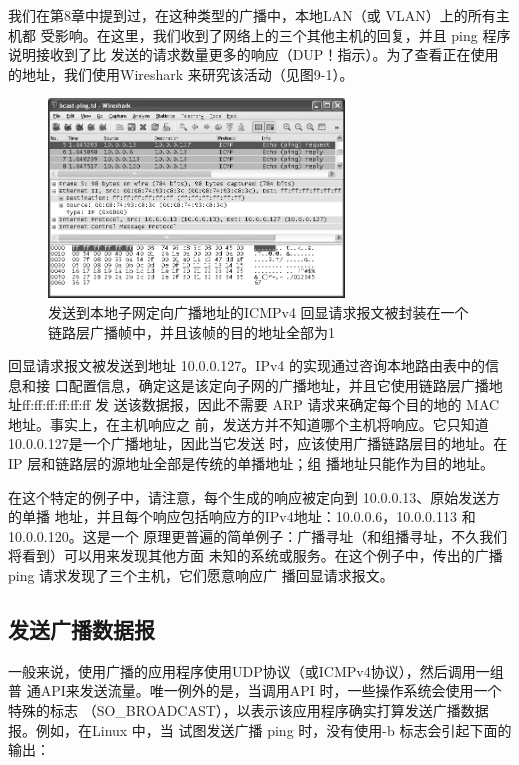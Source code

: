 我们在第8章中提到过，在这种类型的广播中，本地LAN（或 VLAN）上的所有主机都
受影响。在这里，我们收到了网络上的三个其他主机的回复，并且 ping 程序说明接收到了比
发送的请求数量更多的响应（DUP！指示）。为了查看正在使用的地址，我们使用Wireshark
来研究该活动（见图9-1）。

\begin{figure}[ht]
    \centering
	\includegraphics[width=0.7\textwidth]{imgs/9/9-1.png}
	\caption{发送到本地子网定向广播地址的ICMPv4 回显请求报文被封装在一个链路层广播帧中，并且该帧的目的地址全部为1}
\end{figure}

回显请求报文被发送到地址 10.0.0.127。IPv4 的实现通过咨询本地路由表中的信息和接
口配置信息，确定这是该定向子网的广播地址，并且它使用链路层广播地址ff:ff:ff:ff:ff:ff 发
送该数据报，因此不需要 ARP 请求来确定每个目的地的 MAC地址。事实上，在主机响应之
前，发送方并不知道哪个主机将响应。它只知道10.0.0.127是一个广播地址，因此当它发送
时，应该使用广播链路层目的地址。在IP 层和链路层的源地址全部是传统的单播地址；组
播地址只能作为目的地址。

在这个特定的例子中，请注意，每个生成的响应被定向到 10.0.0.13、原始发送方的单播
地址，并且每个响应包括响应方的IPv4地址：10.0.0.6，10.0.0.113 和 10.0.0.120。这是一个
原理更普遍的简单例子：广播寻址（和组播寻址，不久我们将看到）可以用来发现其他方面
未知的系统或服务。在这个例子中，传出的广播 ping 请求发现了三个主机，它们愿意响应广
播回显请求报文。

\subsection{发送广播数据报}
一般来说，使用广播的应用程序使用UDP协议（或ICMPv4协议），然后调用一组普
通API来发送流量。唯一例外的是，当调用API 时，一些操作系统会使用一个特殊的标志
（SO\_BROADCAST），以表示该应用程序确实打算发送广播数据报。例如，在Linux 中，当
试图发送广播 ping 时，没有使用-b 标志会引起下面的输出：

